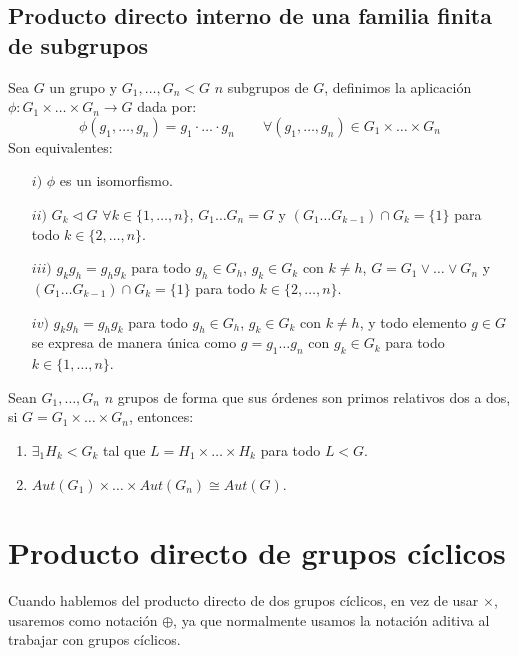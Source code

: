 \subsection{Producto directo interno de una familia finita de subgrupos}
\begin{teo}\label{teo:prod_dir_int_fam}
    Sea $G$ un grupo y $G_1,\ldots,G_n < G$ $n$ subgrupos de $G$, definimos la aplicación $\phi:G_1\times \ldots \times G_n\to G$ dada por:
    \begin{equation*}
        \phi(g_1,\ldots,g_n) = g_1\cdot \ldots \cdot g_n \qquad \forall (g_1,\ldots,g_n)\in G_1\times \ldots \times G_n
    \end{equation*}
    Son equivalentes:
    \begin{enumerate}
        \item[$i)$] $\phi$ es un isomorfismo.
        \item[$ii)$] $G_k\lhd G$ $\forall k\in \{1,\ldots,n\}$, $G_1\ldots G_n = G$ y $(G_1 \ldots G_{k-1}) \cap G_k = \{1\}$ para todo $k\in \{2,\ldots,n\}$.
        \item[$iii)$] $g_k g_h = g_h g_k$ para todo $g_h\in G_h$, $g_k\in G_k$ con $k\neq h$, $G = G_1\lor \ldots \lor G_n$ y $(G_1 \ldots G_{k-1}) \cap G_k = \{1\}$ para todo $k\in \{2,\ldots,n\}$.
        \item[$iv)$] $g_k g_h = g_h g_k$ para todo $g_h\in G_h$, $g_k\in G_k$ con $k\neq h$, y todo elemento $g\in G$ se expresa de manera única como $g= g_1\ldots g_n$ con $g_k \in G_k$ para todo $k \in \{1,\ldots,n\}$.
    \end{enumerate}
\end{teo}

\begin{teo}
    Sean $G_1,\ldots,G_n$ $n$ grupos de forma que sus órdenes son primos relativos dos a dos, si $G = G_1 \times \ldots \times G_n$, entonces:
    \begin{enumerate}
        \item $\exists_1 H_k < G_k$ tal que $L = H_1\times \ldots \times H_k$ para todo $L<G$.
        \item $Aut(G_1)\times \ldots \times Aut(G_n)\cong Aut(G)$.
    \end{enumerate}
\end{teo}

\section{Producto directo de grupos cíclicos}
\begin{notacion}
    Cuando hablemos del producto directo de dos grupos cíclicos, en vez de usar $\times$, usaremos como notación $\oplus$, ya que normalmente usamos la notación aditiva al trabajar con grupos cíclicos.
\end{notacion}

